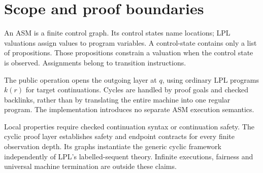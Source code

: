 \section{Scope and proof boundaries}\label{sec:overview}
An ASM is a finite control graph. Its control states name locations;
LPL valuations assign values to program variables. A control-state
 contains only a list of propositions. Those
propositions constrain a valuation when the control state is observed.
Assignments belong to transition instructions.

The public operation  opens the outgoing layer at
$q$, using ordinary LPL programs $k(r)$ for target continuations. Cycles
are handled by proof goals and checked backlinks, rather than by translating
the entire machine into one regular program. The implementation introduces
no separate ASM execution semantics.

Local properties require checked continuation syntax or continuation safety.
The cyclic proof layer establishes safety and endpoint contracts for every
finite observation depth. Its graphs instantiate the generic cyclic
framework independently of LPL's labelled-sequent theory. Infinite executions,
fairness and universal machine termination are outside these claims.
